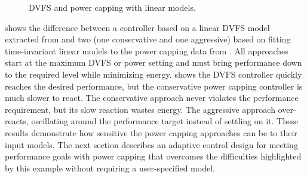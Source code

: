 \begin{figure}
  \centering
  
  \caption{DVFS and power capping with linear models.}
  \label{fig:copper-vips-example}
\end{figure}

 shows the difference between a controller based on a linear DVFS model extracted from  and two (one conservative and one aggressive) based on fitting time-invariant linear models to the power capping data from .
All approaches start at the maximum DVFS or power setting and must bring performance down to the required level while minimizing energy.
 shows the DVFS controller quickly reaches the desired performance, but the conservative power capping controller is much slower to react.
The conservative approach never violates the performance requirement, but its slow reaction wastes energy.
The aggressive approach over-reacts, oscillating around the performance target instead of settling on it.
These results demonstrate how sensitive the power capping approaches can be to their input models.
The next section describes an adaptive control design for meeting performance goals with power capping that overcomes the difficulties highlighted by this example without requiring a user-specified model.
